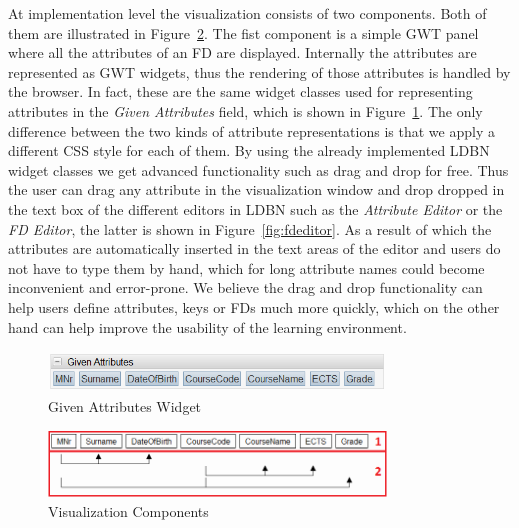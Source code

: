At implementation level the visualization consists of two components. 
Both of them are illustrated in Figure~\ref{fig:impl-fds01}.
The fist component is a simple GWT panel where all the attributes of an FD are displayed. 
Internally the attributes are represented as GWT widgets, thus the rendering of those attributes is
handled by the browser. In fact, these are the same widget classes used for representing
attributes in the \emph{Given Attributes} field, which is shown in Figure~\ref{fig:given-atts}. 
The only difference between the two kinds of attribute representations is 
that we apply a different CSS style for each of them. By using the already implemented LDBN 
widget classes we get advanced functionality such as drag and drop for free. Thus the user
can drag any attribute in the visualization window and drop 
dropped in the text box of the different editors in LDBN
such as the \emph{Attribute Editor} or the \emph{FD Editor}, the latter is 
shown in Figure~\ref{fig:fdeditor}. 
As a result of which the
attributes are automatically inserted in the text areas of the editor and users do not have
to type them by hand, which for long attribute names could become inconvenient and error-prone. 
We believe the drag and drop functionality can help
users define attributes, keys or FDs much more quickly, which on the other hand can
help improve the usability of the learning environment.

\begin{figure}[h]
	\begin{center}
		\includegraphics[width=0.8\textwidth]{./img/given-atts.png}
		\caption{Given Attributes Widget}
		\label{fig:given-atts}
	\end{center}
\end{figure}

\begin{figure}[h]
	\begin{center}
		\includegraphics[width=0.8\textwidth]{./img/impl-fds01.png}
		\caption{Visualization Components}
		\label{fig:impl-fds01}
	\end{center}
\end{figure}

